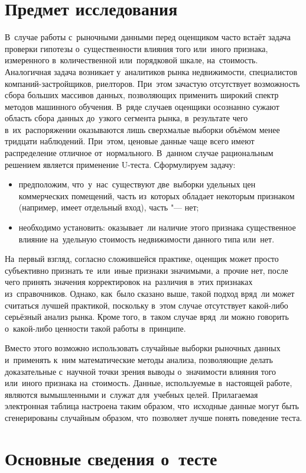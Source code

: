 \documentclass[]{scrartcl}
\begin{document}
\section{Предмет исследования}
В~случае работы с~рыночными данными перед оценщиком часто встаёт задача проверки гипотезы о~существенности влияния того или~иного признака, измеренного в~количественной или~порядковой шкале, на~стоимость. Аналогичная задача возникает у~аналитиков рынка недвижимости, специалистов компаний-застройщиков, риелторов. При~этом зачастую отсутствует возможность сбора больших массивов данных, позволяющих применить широкий спектр методов машинного обучения. В~ряде случаев оценщики осознанно сужают область сбора данных до~узкого сегмента рынка, в~результате чего в~их~распоряжении оказываются лишь сверхмалые выборки объёмом менее тридцати наблюдений. При~этом, ценовые данные чаще всего имеют распределение отличное от~нормального. В~данном случае рациональным решением является применение U-теста. Сформулируем задачу:
\begin{itemize}
	\item предположим, что~у~нас~существуют две~выборки удельных цен коммерческих помещений, часть из~которых обладает некоторым признаком (например, имеет отдельный вход), часть "--- нет;
	\item необходимо установить: оказывает~ли наличие этого признака существенное влияние на~удельную стоимость недвижимости данного типа или~нет.
\end{itemize}
На~первый взгляд, согласно сложившейся практике, оценщик может просто субъективно признать те~или~иные признаки значимыми, а~прочие нет, после чего принять значения корректировок на~различия в~этих признаках из~справочников. Однако, как~было сказано выше, такой подход вряд~ли может считаться лучшей практикой, поскольку в~этом случае отсутствует какой-либо серьёзный анализ рынка. Кроме того, в~таком случае вряд~ли можно говорить о~какой-либо ценности такой работы в~принципе.

Вместо этого возможно использовать случайные выборки рыночных данных и~применять к~ним математические методы анализа, позволяющие делать доказательные с~научной точки зрения выводы о~значимости влияния того или~иного признака на~стоимость. Данные, используемые в~настоящей работе, являются вымышленными и~служат для~учебных целей. Прилагаемая электронная таблица настроена таким образом, что~исходные данные могут быть сгенерированы случайным образом, что~позволяет лучше понять поведение теста. 

\section{Основные сведения о~тесте}
\end{document}
